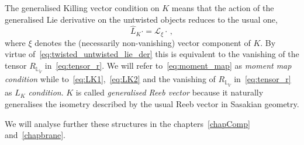 \documentclass[debug]{phd}
\begin{document}
					The generalised Killing vector condition on $K$ means that the action of the generalised Lie derivative on the untwisted objects reduces to the usual one,
							\begin{equation}\label{dorflie}
								\hat{L}_{K} \cdot =\mathcal{L}_{\xi} \cdot \, , 
							\end{equation}
					where $\xi$ denotes the (necessarily non-vanishing) vector component of $K$. 
					By virtue of~\eqref{eq:twisted_untwisted_lie_der} this is equivalent to the vanishing of the tensor $R_{\mathbb{L}_{\tilde{V}}}$ in~\eqref{eq:tensor_r}. 
					We will refer to~\eqref{eq:moment_map} as \emph{moment map condition} while to~\eqref{eq:LK1},~\eqref{eq:LK2} and the vanishing of $R_{\mathbb{L}_{\tilde{V}}}$ in~\eqref{eq:tensor_r} as $L_K$ \emph{condition}.
					$K$ is called \emph{generalised Reeb vector} because it naturally generalises the isometry described by the usual Reeb vector in Sasakian geometry. 
	
					We will analyse further these structures in the chapters~\ref{chapComp} and~\ref{chapbrane}.

\end{document}
